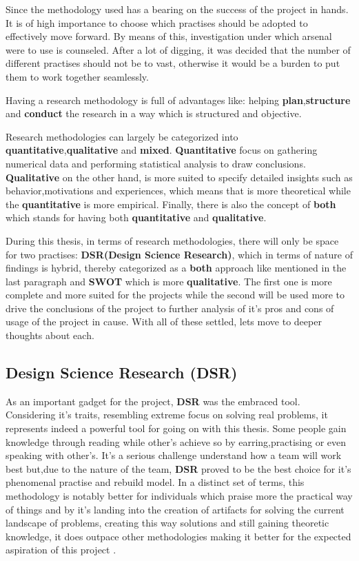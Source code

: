 Since the methodology used has a bearing on the success of the project in hands. It is of high importance to choose which practises should be adopted to effectively move forward. By means of this, investigation under which arsenal were to use is counseled. After a lot of digging, it was decided that the number of different practises should not be to vast, otherwise it would be a burden to put them to work together seamlessly. 

Having a research methodology is full of advantages like: helping \textbf{plan},\textbf{structure} and \textbf{conduct} the research in a way which is structured and objective. 

Research methodologies can largely be categorized into \textbf{quantitative},\textbf{qualitative} and \textbf{mixed}. \textbf{Quantitative} focus on gathering numerical data and performing statistical analysis to draw conclusions. \textbf{Qualitative} on the other hand, is more suited to specify detailed insights such as behavior,motivations and experiences, which means that is more theoretical while the \textbf{quantitative} is more empirical. Finally, there is also the concept of \textbf{both} which stands for having both \textbf{quantitative} and \textbf{qualitative}.

During this thesis, in terms of research methodologies, there will only be space for two practises:  \textbf{DSR(Design Science Research)}, which in terms of nature of findings is hybrid, thereby categorized as a \textbf{both} approach like mentioned in the last paragraph and \textbf{SWOT} which is more \textbf{qualitative}. The first one is more complete and more suited for the projects while the second will be used more to drive the conclusions of the project to further analysis of it's pros and cons of usage of the project in cause. With all of these settled, lets move to deeper thoughts about each.

%
%
%
%
\subsection{Design Science Research (DSR)}
As an important gadget for the project, \textbf{DSR}  was the embraced tool. Considering it's traits, resembling extreme focus on solving real problems, it represents indeed a powerful tool for going on with this thesis. Some people gain knowledge through reading while other's achieve so by earring,practising or even speaking with other's. It's a serious challenge understand how a team will work best but,due to the nature of the team, \textbf{DSR} proved to be the best choice for it's phenomenal practise and rebuild model. In a distinct set of terms, this methodology is notably better for individuals which praise more the practical way of things and by it's landing into the creation of artifacts for solving the current landscape of problems, creating this way solutions and still gaining theoretic knowledge, it does outpace other methodologies making it better for the expected aspiration of this project \cite{dsr-book}.

